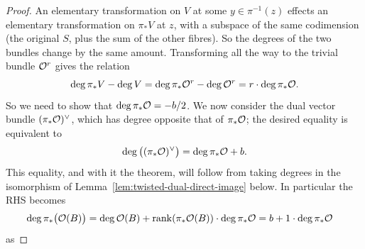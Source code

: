 \documentclass[12pt]{article}
\begin{document}
\begin{proof}
    An elementary transformation on $V$ at some $y\in \pi^{-1}(z)$ effects an elementary
    transformation on $\pi_*V$ at $z$, with a subspace of the same codimension
    (the original $S$, plus the sum of the other fibres).
    So the degrees of the two bundles change by the same amount.
    Transforming all the way to the trivial bundle ${\mathcal{O}}^r$ gives the relation
    \[
        \deg \pi_*V - \deg V
        = \deg \pi_* {\mathcal{O}}^r - \deg {\mathcal{O}}^r
        = r \cdot \deg \pi_* {\mathcal{O}}.
    \]
    So we need to show that $\deg \pi_* {\mathcal{O}} = -b/2$.
    We now consider the dual vector bundle $(\pi_* {\mathcal{O}})^\vee$,
    which has degree opposite that of $\pi_* {\mathcal{O}}$; the desired equality is equivalent to
    \[
        \deg\big((\pi_* {\mathcal{O}})^\vee\big) = \deg \pi_* {\mathcal{O}} + b.
    \]
    This equality, and with it the theorem, will follow from taking degrees in the isomorphism of Lemma~\ref{lem:twisted-dual-direct-image} below. In particular the RHS becomes \begin{align*}
        \deg \pi_* \big({\mathcal{O}}(B)\big) & = \deg {\mathcal{O}}(B) + \operatorname{rank} (\pi_* {\mathcal{O}}(B)) \cdot \deg \pi_* {\mathcal{O}} = b + 1 \cdot \deg \pi_* {\mathcal{O}}
    \end{align*} as
\end{proof}
\end{document}
